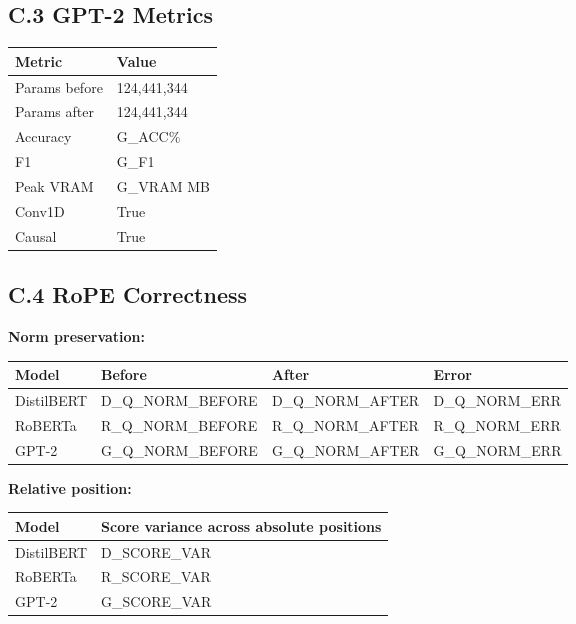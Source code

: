 \subsection{C.3 GPT-2 Metrics}

\begin{table}[H]
\centering
\small
\begin{tabular}{ll}
\toprule
\textbf{Metric} & \textbf{Value} \\
\midrule
Params before & 124,441,344 \\
Params after & 124,441,344 \\
Accuracy & {{G\_ACC}}\% \\
F1 & {{G\_F1}} \\
Peak VRAM & {{G\_VRAM}} MB \\
Conv1D & True \\
Causal & True \\
\bottomrule
\end{tabular}
\end{table}

\subsection{C.4 RoPE Correctness}

\textbf{Norm preservation:}

\begin{table}[H]
\centering
\small
\begin{tabular}{llll}
\toprule
\textbf{Model} & \textbf{Before} & \textbf{After} & \textbf{Error} \\
\midrule
DistilBERT & {{D\_Q\_NORM\_BEFORE}} & {{D\_Q\_NORM\_AFTER}} & {{D\_Q\_NORM\_ERR}} \\
RoBERTa & {{R\_Q\_NORM\_BEFORE}} & {{R\_Q\_NORM\_AFTER}} & {{R\_Q\_NORM\_ERR}} \\
GPT-2 & {{G\_Q\_NORM\_BEFORE}} & {{G\_Q\_NORM\_AFTER}} & {{G\_Q\_NORM\_ERR}} \\
\bottomrule
\end{tabular}
\end{table}

\textbf{Relative position:}

\begin{table}[H]
\centering
\small
\begin{tabular}{ll}
\toprule
\textbf{Model} & \textbf{Score variance across absolute positions} \\
\midrule
DistilBERT & {{D\_SCORE\_VAR}} \\
RoBERTa & {{R\_SCORE\_VAR}} \\
GPT-2 & {{G\_SCORE\_VAR}} \\
\bottomrule
\end{tabular}
\end{table}

